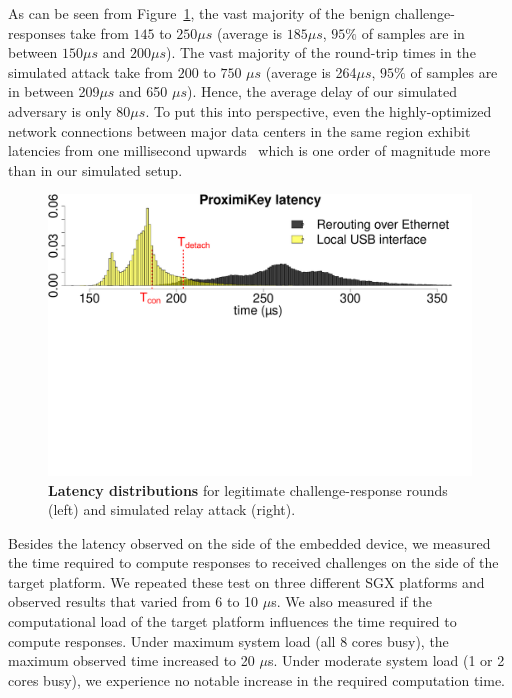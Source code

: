 As can be seen from Figure~\ref{graph:instatAttackerHisto}, the vast majority of the benign challenge-responses take from $145$ to $250 \mu s$ (average is $185 \mu s$, $95\%$ of samples are in between $150\mu s$ and  $200\mu s$). The vast majority of the round-trip times in the simulated attack take from $200$ to $750$ $\mu s$ (average is 264$\mu s$, $95\%$ of samples are in between 209$\mu s$ and 650 $\mu s$). Hence, the average delay of our simulated adversary is only $80 \mu s$. To put this into perspective, even the highly-optimized network connections between major data centers in the same region exhibit latencies from one millisecond upwards~\cite{agarwal_agarwal_2018} which is one order of magnitude more than in our simulated setup.



\begin{figure}[t]
  \centering
    \includegraphics[trim={0 13.4cm 0 0},
    clip,width=\linewidth]{chapters/ProximiTEE/figures/histo.pdf} 
    \caption[Latency distributions]{\textbf{Latency distributions} for legitimate challenge-response rounds (left) and simulated relay attack (right).}
    \label{graph:instatAttackerHisto}
\end{figure}



Besides the latency observed on the side of the embedded device, we measured the time required to compute responses to received challenges on the side of the target platform. We repeated these test on three different SGX platforms and observed results that varied from 6 to 10 $\mu$s. We also measured if the computational load of the target platform influences the time required to compute responses. Under maximum system load (all 8 cores busy), the maximum observed time increased to 20 $\mu$s. Under moderate system load (1 or 2 cores busy), we experience no notable increase in the required computation time. 


